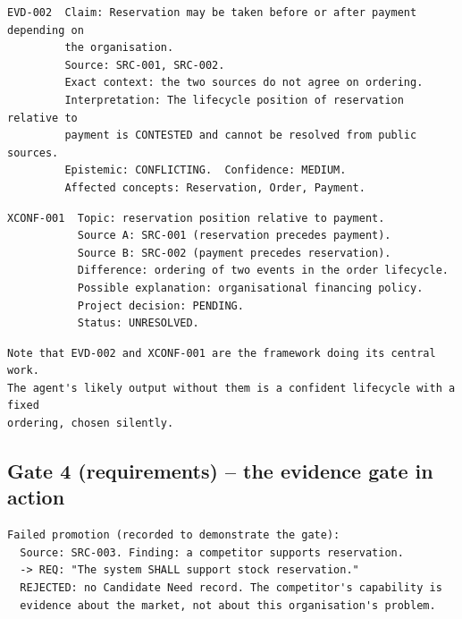 \documentclass[11pt,a4paper]{article}
\begin{document}
\begin{Verbatim}[fontsize=\footnotesize,breaklines=true,breakanywhere=true,breakautoindent=false,samepage=false]
EVD-002  Claim: Reservation may be taken before or after payment depending on
         the organisation.
         Source: SRC-001, SRC-002.
         Exact context: the two sources do not agree on ordering.
         Interpretation: The lifecycle position of reservation relative to
         payment is CONTESTED and cannot be resolved from public sources.
         Epistemic: CONFLICTING.  Confidence: MEDIUM.
         Affected concepts: Reservation, Order, Payment.
\end{Verbatim}

\begin{Verbatim}[fontsize=\footnotesize,breaklines=true,breakanywhere=true,breakautoindent=false,samepage=false]
XCONF-001  Topic: reservation position relative to payment.
           Source A: SRC-001 (reservation precedes payment).
           Source B: SRC-002 (payment precedes reservation).
           Difference: ordering of two events in the order lifecycle.
           Possible explanation: organisational financing policy.
           Project decision: PENDING.
           Status: UNRESOLVED.
\end{Verbatim}

\begin{Verbatim}[fontsize=\footnotesize,breaklines=true,breakanywhere=true,breakautoindent=false,samepage=false]
Note that EVD-002 and XCONF-001 are the framework doing its central work.
The agent's likely output without them is a confident lifecycle with a fixed
ordering, chosen silently.
\end{Verbatim}

\subsection{Gate 4 (requirements) -- the evidence gate in action}

\begin{Verbatim}[fontsize=\footnotesize,breaklines=true,breakanywhere=true,breakautoindent=false,samepage=false]
Failed promotion (recorded to demonstrate the gate):
  Source: SRC-003. Finding: a competitor supports reservation.
  -> REQ: "The system SHALL support stock reservation."
  REJECTED: no Candidate Need record. The competitor's capability is
  evidence about the market, not about this organisation's problem.
\end{Verbatim}
\end{document}

